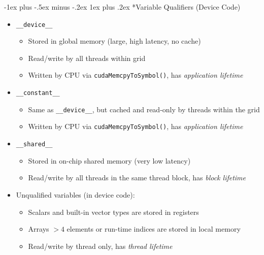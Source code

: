 \documentclass[10pt,landscape]{article}
\makeatletter
\newcommand{\subsubsubsection}{\@startsection{subsubsection}{3}{0mm}%
                                {-1ex plus -.5ex minus -.2ex}%
                                {1ex plus .2ex}%
                                {\normalfont\scriptsize\bfseries}}
\makeatother
\begin{document}
\begin{multicols*}{3}
\subsubsubsection*{Variable Qualifiers (Device Code)}
\begin{itemize}[topsep=0pt,noitemsep,wide=0pt, leftmargin=\dimexpr{} + 2\relax]
    \item \verb|__device__|
    \begin{itemize}[topsep=0pt,noitemsep,wide=0pt, leftmargin=\dimexpr{} + 2\relax]
        \item Stored in global memory (large, high latency, no cache)
        \item Read/write by all threads within grid
        \item Written by CPU via \verb|cudaMemcpyToSymbol()|, has \textit{application lifetime}
    \end{itemize}
    \item \verb|__constant__|
    \begin{itemize}[topsep=0pt,noitemsep,wide=0pt, leftmargin=\dimexpr{} + 2\relax]
        \item Same as \verb|__device__|, but cached and read-only by threads within the grid
        \item Written by CPU via \verb|cudaMemcpyToSymbol()|, has \textit{application lifetime}
    \end{itemize}
    \item \verb|__shared__|
    \begin{itemize}[topsep=0pt,noitemsep,wide=0pt, leftmargin=\dimexpr{} + 2\relax]
        \item Stored in on-chip shared memory (very low latency)
        \item Read/write by all threads in the same thread block, has \textit{block lifetime}
    \end{itemize}
    \item Unqualified variables (in device code):
    \begin{itemize}[topsep=0pt,noitemsep,wide=0pt, leftmargin=\dimexpr{} + 2\relax]
        \item Scalars and built-in vector types are stored in registers
        \item Arrays $> 4$ elements or run-time indices are stored in local memory
        \item Read/write by thread only, has \textit{thread lifetime}
    \end{itemize}
\end{itemize}


\end{multicols*}
\end{document}
